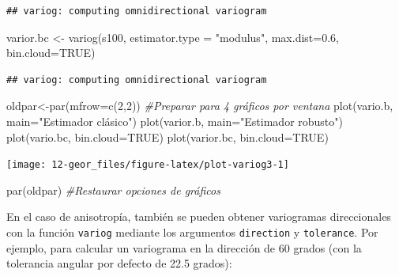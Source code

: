 \documentclass[
  spanish,
]{book}
\newenvironment{Shaded}{\begin{snugshade}}{\end{snugshade}}
\newcommand{\AttributeTok}[1]{\textcolor[rgb]{0.77,0.63,0.00}{#1}}
\newcommand{\CommentTok}[1]{\textcolor[rgb]{0.56,0.35,0.01}{\textit{#1}}}
\newcommand{\ConstantTok}[1]{\textcolor[rgb]{0.00,0.00,0.00}{#1}}
\newcommand{\DecValTok}[1]{\textcolor[rgb]{0.00,0.00,0.81}{#1}}
\newcommand{\FloatTok}[1]{\textcolor[rgb]{0.00,0.00,0.81}{#1}}
\newcommand{\FunctionTok}[1]{\textcolor[rgb]{0.00,0.00,0.00}{#1}}
\newcommand{\NormalTok}[1]{#1}
\newcommand{\OtherTok}[1]{\textcolor[rgb]{0.56,0.35,0.01}{#1}}
\newcommand{\StringTok}[1]{\textcolor[rgb]{0.31,0.60,0.02}{#1}}
\theoremstyle{break}
\theoremstyle{definition}
\theoremstyle{definition}
\theoremstyle{definition}
\theoremstyle{definition}
\theoremstyle{remark}
\begin{document}
\begin{verbatim}
## variog: computing omnidirectional variogram
\end{verbatim}

\begin{Shaded}
\begin{Highlighting}[]
\NormalTok{varior.bc }\OtherTok{\textless{}{-}} \FunctionTok{variog}\NormalTok{(s100, }\AttributeTok{estimator.type =} \StringTok{"modulus"}\NormalTok{, }\AttributeTok{max.dist=}\FloatTok{0.6}\NormalTok{, }\AttributeTok{bin.cloud=}\ConstantTok{TRUE}\NormalTok{)}
\end{Highlighting}
\end{Shaded}

\begin{verbatim}
## variog: computing omnidirectional variogram
\end{verbatim}

\begin{Shaded}
\begin{Highlighting}[]
\NormalTok{oldpar}\OtherTok{\textless{}{-}}\FunctionTok{par}\NormalTok{(}\AttributeTok{mfrow=}\FunctionTok{c}\NormalTok{(}\DecValTok{2}\NormalTok{,}\DecValTok{2}\NormalTok{)) }\CommentTok{\#Preparar para 4 gráficos por ventana}
\FunctionTok{plot}\NormalTok{(vario.b, }\AttributeTok{main=}\StringTok{"Estimador clásico"}\NormalTok{)}
\FunctionTok{plot}\NormalTok{(varior.b, }\AttributeTok{main=}\StringTok{"Estimador robusto"}\NormalTok{)}
\FunctionTok{plot}\NormalTok{(vario.bc, }\AttributeTok{bin.cloud=}\ConstantTok{TRUE}\NormalTok{)}
\FunctionTok{plot}\NormalTok{(varior.bc, }\AttributeTok{bin.cloud=}\ConstantTok{TRUE}\NormalTok{)}
\end{Highlighting}
\end{Shaded}

\begin{center}\texttt{[image: 12-geor\_files/figure-latex/plot-variog3-1]} \end{center}

\begin{Shaded}
\begin{Highlighting}[]
\FunctionTok{par}\NormalTok{(oldpar) }\CommentTok{\#Restaurar opciones de gráficos}
\end{Highlighting}
\end{Shaded}

En el caso de anisotropía, también se pueden obtener variogramas direccionales con la función
\texttt{variog} mediante los argumentos \texttt{direction} y \texttt{tolerance}. Por ejemplo,
para calcular un variograma en la dirección de 60 grados (con la
tolerancia angular por defecto de 22.5 grados):
\end{document}
